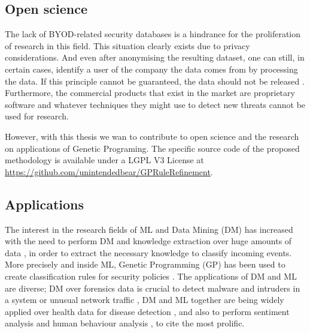 \subsection{Open science}
\label{subsec:openS}

The lack of BYOD-related security databases is a hindrance for the proliferation of research in this field. This situation clearly exists due to privacy considerations. 
And even after anonymising the resulting dataset, one can still, in certain cases, identify a user of the company the data comes from by processing the data. If this principle cannot be guaranteed, the data should not be released \cite{boillat2014handbook}. Furthermore, the commercial products that exist in the market \cite{de2015corporate} are proprietary software and whatever techniques they might use to detect new threats cannot be used for research.

However, with this thesis we wan to contribute to open science and the research on applications of Genetic Programing. 
 The specific source code of the proposed methodology is available under a LGPL V3 License at \url{https://github.com/unintendedbear/GPRuleRefinement}. 

\subsection{Applications}
\label{subsec:apps}

The interest in the research fields of ML and Data Mining (DM) has increased with the need to perform DM and knowledge extraction over huge amounts of data \cite{witten2016data}, in order to extract the necessary knowledge to classify incoming events. More precisely and inside ML, Genetic Programming (GP) has been used to create classification rules for security policies \cite{freitas2002data, DeFalco2002257, sec_policy_evolution_gp_08, pol_evol_gp_3_approaches_08}. The applications of DM and ML are diverse; DM over forensics data is crucial to detect malware \cite{Ma:2011:LDM:1961189.1961202, DeVel2001} and intruders in a system \cite{Jaswal2015} or unusual network traffic \cite{Shalaginov2017359}, DM and ML together are being widely applied over health data for disease detection \cite{Murdoch20131351}, and also to perform sentiment analysis \cite{Poria201445, Ravi201514} and human behaviour analysis \cite{Kosinski20135802}, to cite the most prolific. %

